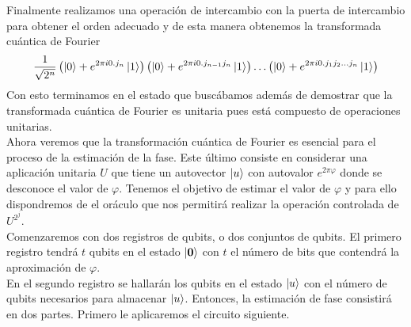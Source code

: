 \documentclass[a4paper]{article}
\numberwithin{equation}{section}
\begin{document}
Finalmente realizamos una operación de intercambio con la puerta de intercambio para obtener el orden adecuado y de esta manera obtenemos la transformada cuántica de Fourier
\begin{equation}
\frac{1}{\sqrt{2^n}}
\left( \ket{0} + e^{2\pi i 0.j_n}\ket{1} \right)
\left( \ket{0} + e^{2\pi i 0.j_{n-1} j_n}\ket{1} \right)
\ldots
\left( \ket{0} + e^{2\pi i 0.j_1 j_2\ldots j_n}\ket{1} \right)
\end{equation}
Con esto terminamos en el estado que buscábamos además de demostrar que la transformada cuántica de Fourier es unitaria pues está compuesto de operaciones unitarias.\\

Ahora veremos que la transformación cuántica de Fourier es esencial para el proceso de la estimación de la fase. Este último consiste en considerar una aplicación unitaria $U$ que tiene un autovector $\ket{u}$ con autovalor $e^{2\pi \varphi}$ donde se desconoce el valor de $\varphi$. Tenemos el objetivo de estimar el valor de $\varphi$ y para ello dispondremos de el oráculo que nos permitirá realizar la operación controlada de $U^{2^j}$.\\
Comenzaremos con dos registros de qubits, o dos conjuntos de qubits. El primero registro tendrá $t$ qubits en el estado $\ket{\mathbf{0}}$ con $t$ el número de bits que contendrá la aproximación de $\varphi$.\\
En el segundo registro se hallarán los qubits en el estado $\ket{u}$ con el número de qubits necesarios para almacenar $\ket{u}$. Entonces, la estimación de fase consistirá en dos partes. Primero le aplicaremos el circuito siguiente.
\end{document}

